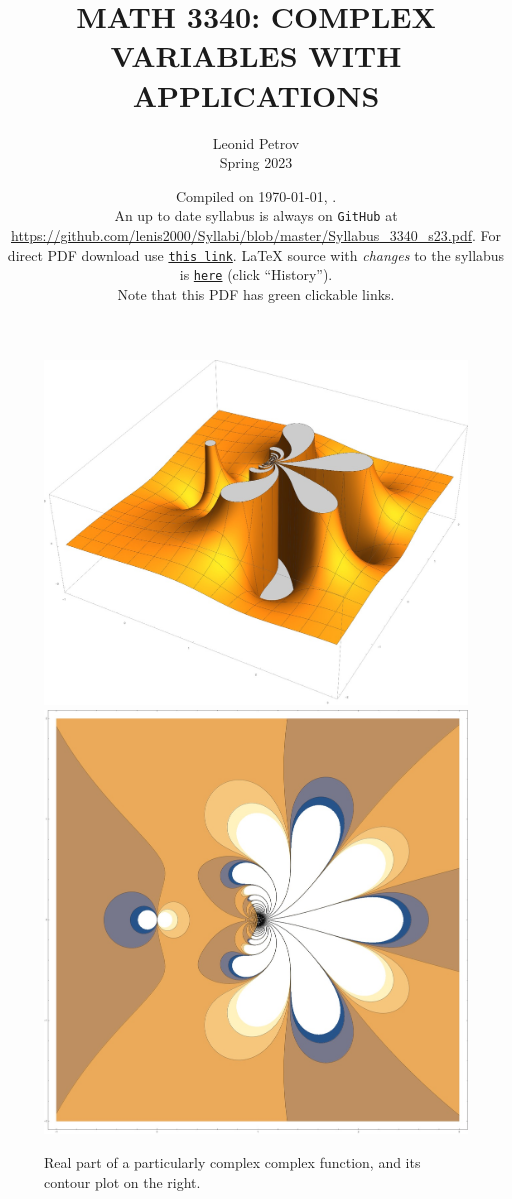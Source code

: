 \documentclass[oneside,11pt]{amsart}
\begin{document}
\title[MATH 3340: COMPLEX VARIABLES WITH APPLICATIONS]{MATH 3340: COMPLEX VARIABLES WITH APPLICATIONS}
\author{Leonid Petrov\\Spring 2023}
\date{Compiled on \today, \currenttime{}.\\An up to date syllabus is always on \texttt{GitHub} at \url{https://github.com/lenis2000/Syllabi/blob/master/Syllabus_3340_s23.pdf}. For direct PDF download use \href{https://github.com/lenis2000/Syllabi/raw/master/Syllabus_3340_s23.pdf}{\texttt{this link}}.
	\LaTeX{} source with \textit{changes} to the syllabus is \href{https://github.com/lenis2000/Syllabi/blob/master/Syllabus_3340_s23.tex}{\texttt{here}}
(click ``History'').
\\Note that this PDF has green clickable links.}
\maketitle


\begin{figure}[h]
	\includegraphics[height=.4\textwidth]{img/complex_f.jpg}
	\qquad 
	\includegraphics[height=.4\textwidth]{img/complex_f2.jpg}
	\caption{Real part of a particularly complex complex function, and 
	its contour plot on the right.}
\end{figure}
\end{document}
